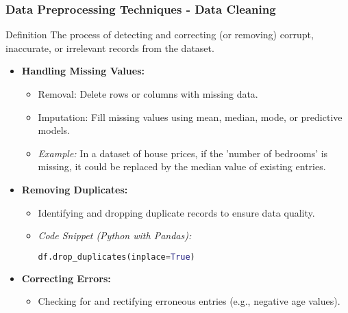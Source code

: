 \documentclass[aspectratio=169]{beamer}
\begin{document}
\begin{frame}[fragile]
    \frametitle{Data Preprocessing Techniques - Data Cleaning}
    \begin{block}{Definition}
        The process of detecting and correcting (or removing) corrupt, inaccurate, or irrelevant records from the dataset.
    \end{block}

    \begin{itemize}
        \item \textbf{Handling Missing Values:}
            \begin{itemize}
                \item Removal: Delete rows or columns with missing data.
                \item Imputation: Fill missing values using mean, median, mode, or predictive models. 
                \item \textit{Example:} In a dataset of house prices, if the 'number of bedrooms' is missing, it could be replaced by the median value of existing entries.
            \end{itemize}

        \item \textbf{Removing Duplicates:}
            \begin{itemize}
                \item Identifying and dropping duplicate records to ensure data quality.
                \item \textit{Code Snippet (Python with Pandas):}
                \begin{lstlisting}[language=Python]
df.drop_duplicates(inplace=True)
                \end{lstlisting}
            \end{itemize}

        \item \textbf{Correcting Errors:}
            \begin{itemize}
                \item Checking for and rectifying erroneous entries (e.g., negative age values).
            \end{itemize}
    \end{itemize}
\end{frame}
\end{document}
